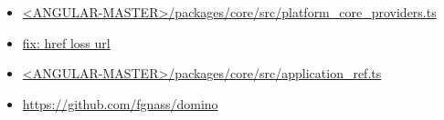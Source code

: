 


\begin{itemize}
  \item \href{https://github.com/angular/angular/blob/master/packages/core/src/platform_core_providers.ts}
        {<ANGULAR-MASTER>/packages/core/src/platform\_core\_providers.ts}
\end{itemize}





\begin{itemize}
  \item \href{fix: href loss url}
        {fix: href loss url}
\end{itemize}





\begin{itemize}
  \item \href{https://github.com/angular/angular/blob/master/packages/core/src/application_ref.ts}
        {<ANGULAR-MASTER>/packages/core/src/application\_ref.ts}
\end{itemize}






\begin{itemize}
  \item \url{https://github.com/fgnass/domino}
\end{itemize}

